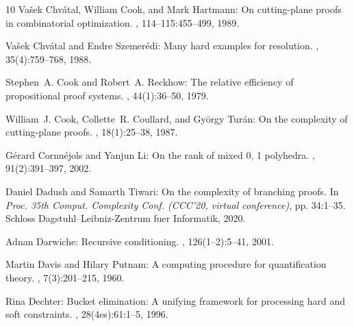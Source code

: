 \documentclass[11pt]{article}
\begin{document}
\begin{thebibliography}{10}
{\sc Va{\v{s}}ek Chv{\'a}tal, William Cook, and Mark Hartmann}: On
  cutting-plane proofs in combinatorial optimization.
, 114--115:455--499, 1989.
\newblock [\epfmtdoi{10.1016/0024-3795(89)90476-x}]

{\sc Va{\v{s}}ek Chv{\'{a}}tal and Endre Szemer{\'{e}}di}: Many hard examples
  for resolution.
, 35(4):759--768, 1988.
\newblock [\epfmtdoi{10.1145/48014.48016}]

{\sc Stephen~A. Cook and Robert~A. Reckhow}: The relative efficiency of
  propositional proof systems.
, 44(1):36--50, 1979.
\newblock [\epfmtdoi{10.2307/2273702}]

{\sc William~J. Cook, Collette~R. Coullard, and Gy{\"o}rgy Tur{\'a}n}: On the
  complexity of cutting-plane proofs.
, 18(1):25--38, 1987.
\newblock [\epfmtdoi{10.1016/0166-218X(87)90039-4}]

{\sc G{\'{e}}rard Cornu{\'{e}}jols and Yanjun Li}: On the rank of mixed 0, 1
  polyhedra.
, 91(2):391--397, 2002.
\newblock [\epfmtdoi{10.1007/s101070100250}]

{\sc Daniel Dadush and Samarth Tiwari}: On the complexity of branching proofs.
\newblock In {\em Proc. 35th Comput. Complexity Conf. (CCC'20, virtual
  conference)}, pp. 34:1--35. Schloss Dagstuhl--Leibniz-Zentrum fuer
  Informatik, 2020.

{\sc Adnan Darwiche}: Recursive conditioning.
, 126(1--2):5--41, 2001.
\newblock [\epfmtdoi{10.1016/S0004-3702(00)00069-2}]

{\sc Martin Davis and Hilary Putnam}: A computing procedure for quantification
  theory.
, 7(3):201--215, 1960.
\newblock [\epfmtdoi{10.1145/321033.321034}]

{\sc Rina Dechter}: Bucket elimination: {A} unifying framework for processing
  hard and soft constraints.
, 28(4es):61:1--5, 1996.
\newblock [\epfmtdoi{10.1145/242224.242302}]


\end{thebibliography}
\end{document}
